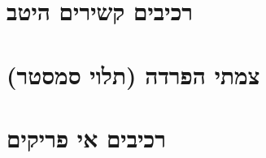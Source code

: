 \documentclass[]{article}
\begin{document}
	
\def\lecnum{3}
\def\insert#1{}




\section*{רכיבים קשירים היטב}
\insert{scc}

\section*{צמתי הפרדה (תלוי סמסטר)}
\insert{cut-vertex}

\section*{רכיבים אי פריקים}
\insert{block}
\end{document}
